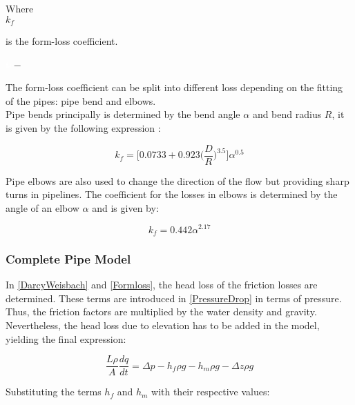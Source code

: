  \begin{minipage}[t]{0.20\textwidth}
Where\\
\hspace*{8mm} $k_f$ 
\end{minipage}
\begin{minipage}[t]{0.68\textwidth}
\vspace*{2mm}
is the form-loss coefficient.  
 \end{minipage}
\begin{minipage}[t]{0.10\textwidth}
\vspace*{2mm}
\textcolor{White}{te}$\unit{-}$
\end{minipage}

The form-loss coefficient can be split into different loss depending on the 
fitting of the pipes: pipe bend and elbows. 
\\
Pipe bends principally is determined by the 
bend angle $\alpha$ and bend radius $R$, it is given by the following 
expression \cite{Design_Water}: 

\begin{equation}
  k_f = \bigg[0.0733 + 0.923 \bigg(\frac{D}{R}\bigg)^{3.5}\bigg]\alpha^{0.5}
\end{equation}

Pipe elbows are also used to change the direction of the flow but providing 
sharp turns in pipelines. The coefficient for the losses in elbows is determined by the angle of an elbow $\alpha$ and is given by:

\begin{equation}
  k_f = 0.442\alpha^{2.17}
\end{equation}

\subsubsection{Complete Pipe Model}
In \eqref{DarcyWeisbach} and \eqref{Formloss}, the head loss of the friction losses are determined. These terms are introduced in \eqref{PressureDrop} in terms of pressure. Thus, the friction factors are multiplied by the water density and gravity. Nevertheless, the head loss due to elevation has to be added in the model, yielding the final expression:

\begin{equation}
   \frac{L \rho}{A} \frac{dq}{dt} =\Delta p - h_f \rho g - h_m \rho g - \Delta z \rho 
   g
\end{equation}

Substituting the terms $h_f$ and $h_m$ with their respective values:

